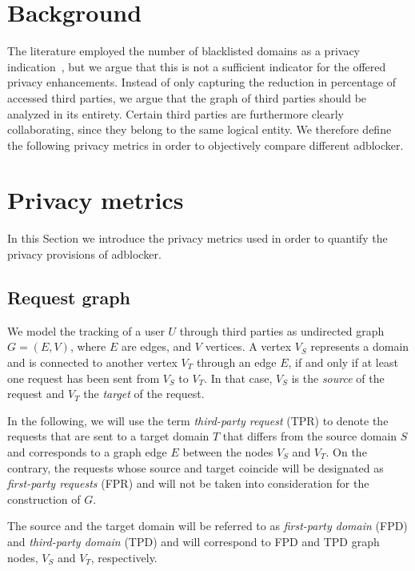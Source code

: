 \documentclass{sig-alternate}
\begin{document}
\section{Background} \label{sec:background}
The literature employed the number of blacklisted domains as a privacy indication~\cite{XX}, but we argue that this is not a sufficient indicator for the offered privacy enhancements. Instead of only capturing the reduction in percentage of accessed third parties, we argue that the graph of third parties should be analyzed in its entirety. Certain third parties are furthermore clearly collaborating, since they belong to the same logical entity. We therefore define the following privacy metrics in order to objectively compare different adblocker.

\section{Privacy metrics} \label{sec:privacy_metrics}
In this Section we introduce the privacy metrics used in order to quantify the privacy provisions of adblocker.


\subsection{Request graph} \label{sec:graph_definition}
We model the tracking of a user $U$ through third parties as undirected graph $G=(E,V)$, where $E$ are edges, and $V$ vertices. A vertex $V_S$ represents a domain and is connected to another vertex $V_T$ through an edge $E$, if and only if at least one request has been sent from $V_S$ to $V_T$. In that case, $V_S$ is the \textit{source} of the request and $V_T$ the \textit{target} of the request.

{\color{blue}
In the following, we will use the term \textit{third-party request} (TPR) to denote the requests that are sent to a target domain $T$ that differs from the source domain $S$ and corresponds to a graph edge $E$ between the nodes $V_S$ and $V_T$. On the contrary, the requests whose source and target coincide will be designated as \textit{first-party requests} (FPR) and will not be taken into consideration for the construction of $G$.

The source and the target domain will be referred to as \textit{first-party domain} (FPD) and \textit{third-party domain} (TPD) and will correspond to FPD and TPD graph nodes, $V_S$ and $V_T$, respectively.
}
\end{document}
